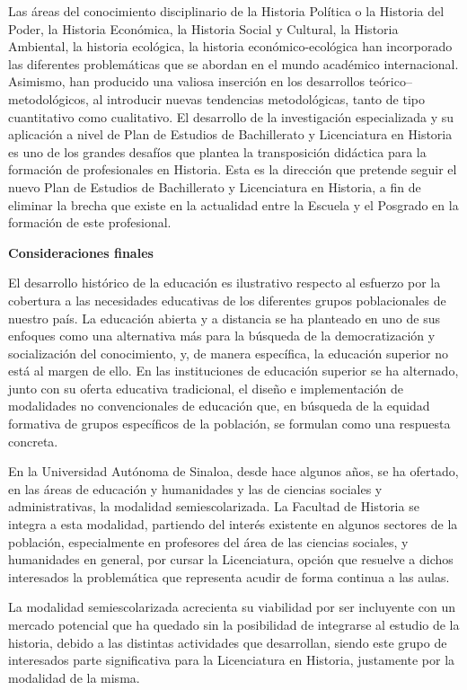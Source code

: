 Las áreas del conocimiento disciplinario de la Historia Política o la
Historia del Poder, la Historia Económica, la Historia Social y Cultural,
la Historia Ambiental, la historia ecológica, la historia
económico-ecológica han incorporado las diferentes problemáticas que se
abordan en el mundo académico internacional. Asimismo, han producido una
valiosa inserción en los desarrollos teórico–metodológicos, al introducir
nuevas tendencias metodológicas, tanto de tipo cuantitativo como
cualitativo. El desarrollo de la investigación especializada y su
aplicación a nivel de Plan de Estudios de Bachillerato y Licenciatura en
Historia es uno de los grandes desafíos que plantea la transposición
didáctica para la formación de profesionales en Historia. Esta es la
dirección que pretende seguir el nuevo Plan de Estudios de Bachillerato y
Licenciatura en Historia, a fin de eliminar la brecha que existe en la
actualidad entre la Escuela y el Posgrado en la formación de este
profesional.

\bigskip
\textbf{Consideraciones finales}

El desarrollo histórico de la educación es ilustrativo respecto al esfuerzo
por la cobertura a las necesidades educativas de los diferentes grupos
poblacionales de nuestro país. La educación abierta y a distancia se ha
planteado en uno de sus enfoques como una alternativa más para la búsqueda
de la democratización y socialización  del conocimiento, y, de manera
específica, la educación  superior no está al margen de ello. En las
instituciones de educación  superior se ha alternado,  junto con su oferta
educativa tradicional, el diseño e implementación de modalidades no
convencionales de educación que, en búsqueda de la equidad formativa de grupos
específicos de la población, se formulan como una respuesta concreta.

En la Universidad Autónoma de Sinaloa, desde hace algunos años, se ha
ofertado, en las áreas de educación y humanidades y 
las de ciencias sociales y administrativas, la modalidad semiescolarizada. La
Facultad de Historia se integra a esta modalidad, partiendo
del interés existente en algunos sectores de la
población, especialmente en profesores del área de las ciencias sociales, y
humanidades en general, por cursar la Licenciatura, opción que resuelve a
dichos interesados la problemática que representa acudir de forma continua
a las aulas.

La modalidad semiescolarizada acrecienta su viabilidad
por ser incluyente con un mercado potencial que ha quedado sin la
posibilidad de integrarse al estudio de la historia, debido a las
distintas actividades que desarrollan, siendo este grupo
de interesados parte significativa para la Licenciatura en Historia,
justamente por la modalidad de la misma.

